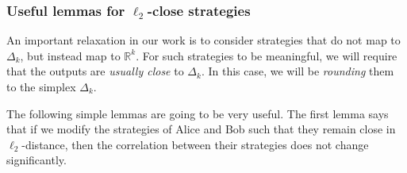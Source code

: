 \documentclass[11pt]{article}
\newcommand{\bbR}{{\mathbb R}}
\begin{document}
\subsubsection*{Useful lemmas for $\ell_2$-close strategies}

An important relaxation in our work is to consider strategies that do not map to $\Delta_k$, but instead map to $\bbR^k$. For such strategies to be meaningful, we will require that the outputs are {\em usually close} to $\Delta_k$. In this case, we will be {\em rounding} them to the simplex $\Delta_k$.

The following simple lemmas are going to be very useful. The first lemma says that if we modify the strategies of Alice and Bob such that they remain close in $\ell_2$-distance, then the correlation between their strategies does not change significantly.
\end{document}
